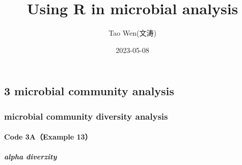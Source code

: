 \documentclass[
]{article}
\title{Using R in microbial analysis}
\author{Tao Wen(文涛)}
\date{2023-05-08}
\begin{document}
\maketitle

{
\setcounter{tocdepth}{3}
\tableofcontents
}
\hypertarget{microbial-community-analysis}{%
\subsection{3 microbial community
analysis}\label{microbial-community-analysis}}

\hypertarget{microbial-community-diversity-analysis}{%
\subsubsection{microbial community diversity
analysis}\label{microbial-community-diversity-analysis}}

\hypertarget{code-3aexample-13}{%
\paragraph{Code 3A（Example 13）}\label{code-3aexample-13}}

\hypertarget{alpha-diverzity}{%
\subparagraph{alpha diverzity}\label{alpha-diverzity}}
\end{document}
